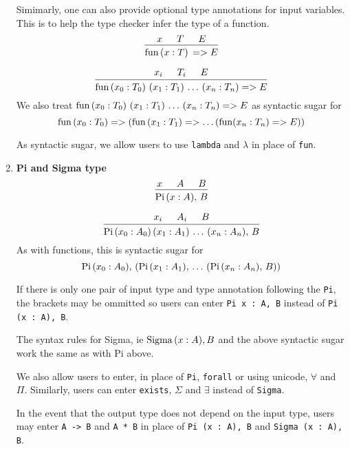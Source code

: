 \documentclass{article}
\begin{document}
\begin{enumerate}
  Simimarly, one can also provide optional type annotations for input variables.
  This is to help the type checker infer the type of a function.
  \[
    \begin{prooftree}
      \hypo{x}
      \hypo{T}
      \hypo{E}
      \infer3{\fun \, (x : T) \, => E}
    \end{prooftree}
  \]

  \[
    \begin{prooftree}
      \hypo{x_i}
      \hypo{T_i}
      \hypo{E}
      \infer3{\fun \, (x_0 : T_0) \,\, (x_1 : T_1) \, \dots \, (x_n : T_n) => E}
    \end{prooftree}
  \]
  We also treat $\operatorname{fun} \, (x_0 : T_0) \,\, (x_1 : T_1) \, \dots \, (x_n : T_n) => E$
  as syntactic sugar for
  \[ \operatorname{fun} \, (x_0 : T_0) => (\operatorname{fun} \, (x_1 : T_1) => \dots (\operatorname{fun} (x_n : T_n) => E)) \]

  As syntactic sugar, we allow users to use \verb|lambda| and $\lambda$ in place
  of \verb|fun|. 

\item \textbf{Pi and Sigma type} \\
  \[
    \begin{prooftree}
      \hypo{x}
      \hypo{A}
      \hypo{B}
      \infer3{\Pii \, (x : A), \, B}
    \end{prooftree}
  \] 

  \[
    \begin{prooftree}
      \hypo{x_i}
      \hypo{A_i}
      \hypo{B}
      \infer3{\Pii \, (x_0 : A_0) \, (x_1 : A_1) \, \dots \, (x_n : A_n), \, B}
    \end{prooftree}
  \] 
  As with functions, this is syntactic sugar for
  \[ \operatorname{Pi} \, (x_0 : A_0), \, (\operatorname{Pi} \, (x_1 : A_1), \,  \dots \, (\operatorname{Pi} \, (x_n : A_n), \, B)) \]

  If there is only one pair of input type and type annotation following the \verb|Pi|,
  the brackets may be ommitted so users can enter \verb|Pi x : A, B| instead of
  \verb|Pi (x : A), B|.

  The syntax rules for Sigma, ie $\operatorname{Sigma}\, (x : A), B$ and the above syntactic
  sugar work the same as with Pi above. 

  We also allow users to enter, in place of \verb|Pi|, \verb|forall| or using
  unicode, $\forall$ and $\Pi$.
  Similarly, users can enter \verb|exists|, $\Sigma$ and $\exists$ instead of
  \verb|Sigma|.

  In the event that the output type does not depend on the input type, users
  may enter \verb|A -> B| and \verb|A * B| in place of 
  \verb|Pi (x : A), B| and \verb|Sigma (x : A), B|.


\end{enumerate}
\end{document}
